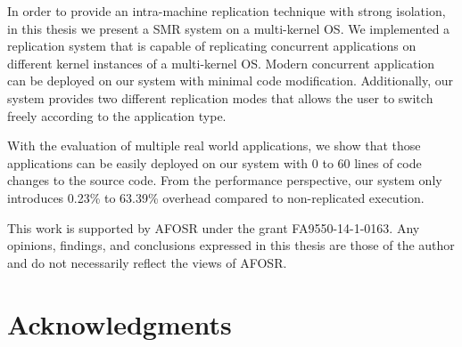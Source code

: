 \documentclass[12pt]{report}
\begin{document}
In order to provide an intra-machine replication technique with strong isolation, in this thesis we present a SMR system on a multi-kernel OS. We implemented a replication system that is capable of replicating concurrent applications on different kernel instances of a multi-kernel OS. Modern concurrent application can be deployed on our system with minimal code modification. Additionally, our system provides two different replication modes that allows the user to switch freely according to the application type.

With the evaluation of multiple real world applications, we show that those applications can be easily deployed on our system with 0 to 60 lines of code changes to the source code. From the performance perspective, our system only introduces 0.23\% to 63.39\% overhead compared to non-replicated execution. 

\vfill


This work is supported by AFOSR under the grant FA9550-14-1-0163.  Any opinions, findings, and conclusions expressed in this thesis are those of the author and do not necessarily reflect the views of AFOSR.

\pagebreak

\chapter*{Acknowledgments}


\tableofcontents
\pagebreak

\listoffigures
\pagebreak

\listoftables
\pagebreak

\pagestyle{myheadings}

\newcommand{\detstart}{\_\_det\_start}
\newcommand{\detend}{\_\_det\_end}
\newcommand{\dettick}{\_\_det\_tick}












%

\end{document}

